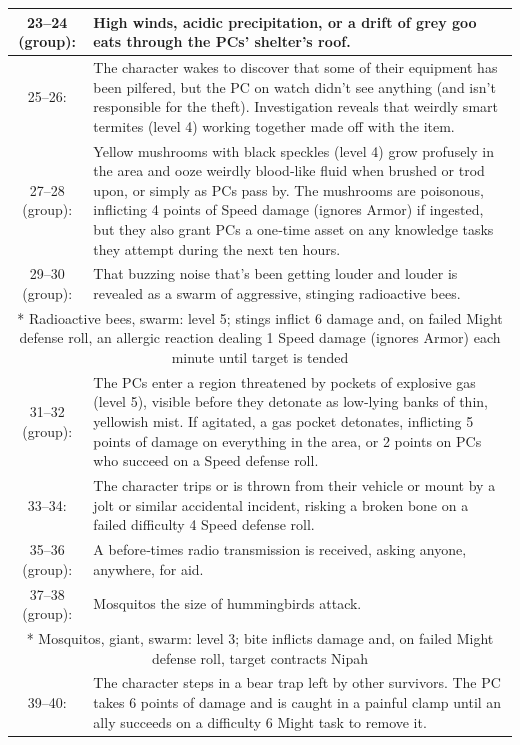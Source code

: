 \begin{longtable}{| c | p{12cm} |}
23–24 (group): & High winds, acidic precipitation, or a drift of grey goo eats through the PCs’ shelter’s roof. \\ \hline
25–26: & The character wakes to discover that some of their equipment has been pilfered, but the PC on watch didn’t see anything (and isn’t responsible for the theft). Investigation reveals that weirdly smart termites (level 4) working together made off with the item. \\ \hline
27–28 (group): &  Yellow mushrooms with black speckles (level 4) grow profusely in the area and ooze weirdly blood‑like fluid when brushed or trod upon, or simply as PCs pass by. The mushrooms are poisonous, inflicting 4 points of Speed damage (ignores Armor) if ingested, but they also grant PCs a one‑time asset on any knowledge tasks they attempt during the next ten hours. \\ \hline
29–30 (group):  & That buzzing noise that’s been getting louder and louder is revealed as a swarm of aggressive, stinging radioactive bees. \\ \hline
 \multicolumn{2}{|p{15cm}|}{* Radioactive bees, swarm: level 5; stings inflict 6 damage and, on failed Might defense roll, an allergic reaction dealing 1 Speed damage (ignores Armor) each minute until target is tended} \\ \hline
31–32 (group):  & The PCs enter a region threatened by pockets of explosive gas (level 5), visible before they detonate as low‑lying banks of thin, yellowish mist. If agitated, a gas pocket detonates, inflicting 5 points of damage on everything in the area, or 2 points on PCs who succeed on a Speed defense roll. \\ \hline
33–34: & The character trips or is thrown from their vehicle or mount by a jolt or similar accidental incident, risking a broken bone on a failed difficulty 4 Speed defense roll. \\ \hline
35–36 (group):  & A before‑times radio transmission is received, asking anyone, anywhere, for aid. \\ \hline
37–38 (group):  & Mosquitos the size of hummingbirds attack. \\ \hline
 \multicolumn{2}{|p{15cm}|}{* Mosquitos, giant, swarm: level 3; bite inflicts damage and, on failed Might defense roll, target contracts Nipah }  \\ \hline
39–40:  & The character steps in a bear trap left by other survivors. The PC takes 6 points of damage and is caught in a painful clamp until an ally succeeds on a difficulty 6 Might task to remove it. \\ \hline

\end{longtable}
